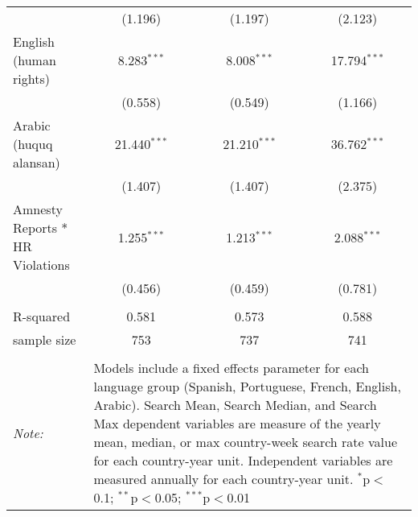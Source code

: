 \begin{table}[!htbp]
\begin{tabular}{@{\extracolsep{5pt}}lccc}
  & (1.196) & (1.197) & (2.123) \\ 
  English (human rights) & 8.283$^{***}$ & 8.008$^{***}$ & 17.794$^{***}$ \\ 
  & (0.558) & (0.549) & (1.166) \\ 
  Arabic (huquq alansan) & 21.440$^{***}$ & 21.210$^{***}$ & 36.762$^{***}$ \\ 
  & (1.407) & (1.407) & (2.375) \\ 
  Amnesty Reports * HR Violations & 1.255$^{***}$ & 1.213$^{***}$ & 2.088$^{***}$ \\ 
  & (0.456) & (0.459) & (0.781) \\ 
 \hline \\[-1.8ex] 
R-squared  & 0.581 & 0.573 & 0.588 \\ 
sample size  & 753 & 737 & 741 \\ 
\hline 
\hline \\[-1.8ex] 
\textit{Note:}  & \multicolumn{3}{l}{\parbox[t]{8cm}{Models include a fixed effects parameter for each language group (Spanish, Portuguese, French, English, Arabic). Search Mean, Search Median, and Search Max dependent variables are measure of the yearly mean, median, or max country-week search rate value for each country-year unit. Independent variables are measured annually for each country-year unit. $^{*}$p$<$0.1; $^{**}$p$<$0.05; $^{***}$p$<$0.01}} \\ 
\end{tabular} 
\end{table} 
